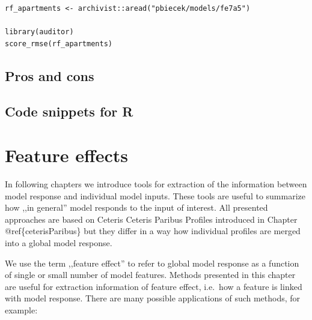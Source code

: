 \documentclass[12pt,]{krantz}
\begin{document}
\begin{verbatim}
rf_apartments <- archivist::aread("pbiecek/models/fe7a5")

library(auditor)
score_rmse(rf_apartments)
\end{verbatim}

\hypertarget{modelPerformanceProsCons}{%
\subsection{Pros and cons}\label{modelPerformanceProsCons}}

\hypertarget{modelPerformanceR}{%
\subsection{Code snippets for R}\label{modelPerformanceR}}

\hypertarget{featureEffects}{%
\section{Feature effects}\label{featureEffects}}

In following chapters we introduce tools for extraction of the information between model response and individual model inputs. These tools are useful to summarize how ,,in general'' model responds to the input of interest. All presented approaches are based on Ceteris Ceteris Paribus Profiles introduced in Chapter @ref\{ceterisParibus\} but they differ in a way how individual profiles are merged into a global model response.

We use the term ,,feature effect'' to refer to global model response as a function of single or small number of model features.
Methods presented in this chapter are useful for extraction information of feature effect, i.e.~how a feature is linked with model response. There are many possible applications of such methods, for example:
\end{document}
